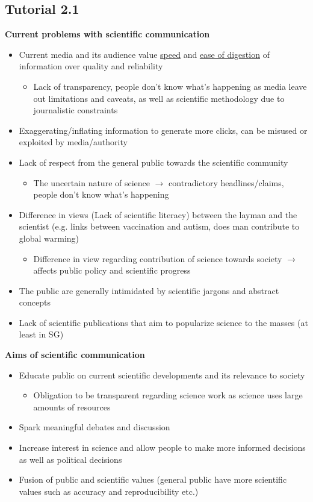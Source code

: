 \documentclass{article}
\begin{document}
\begin{multicols}{2}
\subsection{Tutorial 2.1}
\textbf{Current problems with scientific communication}
\begin{itemize}
	\item Current media and its audience value \underline{speed} and \underline{ease of digestion} of information over quality and reliability
	\begin{itemize}
		\item Lack of transparency, people don't know what's happening as media leave out limitations and caveats, as well as scientific methodology due to journalistic constraints
	\end{itemize}
	\item Exaggerating/inflating information to generate more clicks, can be misused or exploited by media/authority
	\item Lack of respect from the general public towards the scientific community
	\begin{itemize}
		\item The uncertain nature of science $\rightarrow$ contradictory headlines/claims, people don't know what's happening
	\end{itemize}	 
	\item Difference in views (Lack of scientific literacy) between the layman and the scientist (e.g. links between vaccination and autism, does man contribute to global warming)
	\begin{itemize}
		\item Difference in view regarding contribution of science towards society $\rightarrow$ affects public policy and scientific progress
	\end{itemize}
	\item The public are generally intimidated by scientific jargons and abstract concepts
	\item Lack of scientific publications that aim to popularize science to the masses (at least in SG)\\
\end{itemize}

\textbf{Aims of scientific communication}
\begin{itemize}
	\item Educate public on current scientific developments and its relevance to society
	\begin{itemize}
		\item Obligation to be transparent regarding science work as science uses large amounts of resources
	\end{itemize}
	\item Spark meaningful debates and discussion
	\item Increase interest in science and allow people to make more informed decisions as well as political decisions
	\item Fusion of public and scientific values (general public have more scientific values such as accuracy and reproducibility etc.)\\
\end{itemize}


\end{multicols}
\end{document}
